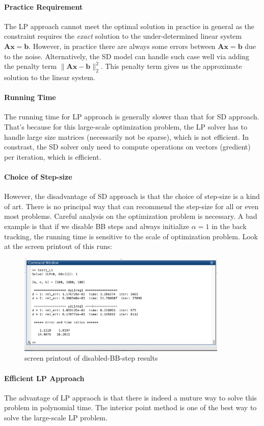 \paragraph{Practice Requirement}
The LP approach cannot meet the optimal solution in practice in general as the constraint requires the \emph{exact} solution to the under-determined linear system $\bm{Ax}=\bm b$. However, in practice there are always some errors between $\bm{Ax}=\bm b$ due to the noise. Alternatively, the SD model can handle such case well via adding the penalty term $\|\bm{Ax}-\bm b\|_2^2$. This penalty term gives us the approximate solution to the linear system.
\paragraph{Running Time}
The running time for LP approach is generally slower than that for SD approach. That's because for this large-scale optimization problem, the LP solver has to handle large size matrices (necessarily not be sparse), which is not efficient. In constrast, the SD solver only need to compute operations on vectors (gredient) per iteration, which is efficient.
\paragraph{Choice of Step-size}
However, the disadvantage of SD approach is that the choice of step-size is a kind of art. There is no principal way that can recommend the step-size for all or even most problems. Careful analysis on the optimization problem is necessary. A bad example is that if we disable BB steps and always initialize $\alpha=1$ in the back tracking, the running time is sensitive to the scale of optimization problem. Look at the screen printout of this runs:
\begin{figure}[H]
\centering
\includegraphics[width=10cm]{Test}
\caption{screen printout of disabled-BB-step results}
\end{figure}
\paragraph{Efficient LP Approach}
The advantage of LP appraoch is that there is indeed a muture way to solve this problem in polynomial time. The interior point method is one of the best way to solve the large-scale LP problem.











